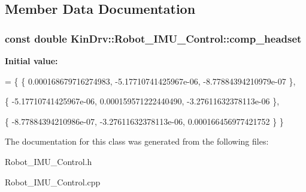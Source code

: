 \subsection{Member Data Documentation}
\hypertarget{classKinDrv_1_1Robot__IMU__Control_a1acf749d1d1d97813baeecf0c8b74830}{
\subsubsection[{comp\+\_\+headset}]{\setlength{\rightskip}{0pt plus 5cm}const double Kin\+Drv\+::\+Robot\+\_\+\+I\+M\+U\+\_\+\+Control\+::comp\+\_\+headset\hspace{0.3cm}{\ttfamily [static]}}}\label{classKinDrv_1_1Robot__IMU__Control_a1acf749d1d1d97813baeecf0c8b74830}
{\bfseries Initial value\+:}
\begin{DoxyCode}
= \{ \{ 0.000168679716274983, -5.17710741425967e-06, -8.77884394210979e-07 \},
                                                                                                           
      \{ -5.17710741425967e-06, 0.000159571222440490, -3.27611632378113e-06 \},
                                                                                                           
      \{ -8.77884394210986e-07, -3.27611632378113e-06, 0.000166456977421752 \} \}
\end{DoxyCode}


The documentation for this class was generated from the following files\+:\begin{DoxyCompactItemize}
\item 
Robot\+\_\+\+I\+M\+U\+\_\+\+Control.\+h\item 
Robot\+\_\+\+I\+M\+U\+\_\+\+Control.\+cpp\end{DoxyCompactItemize}
